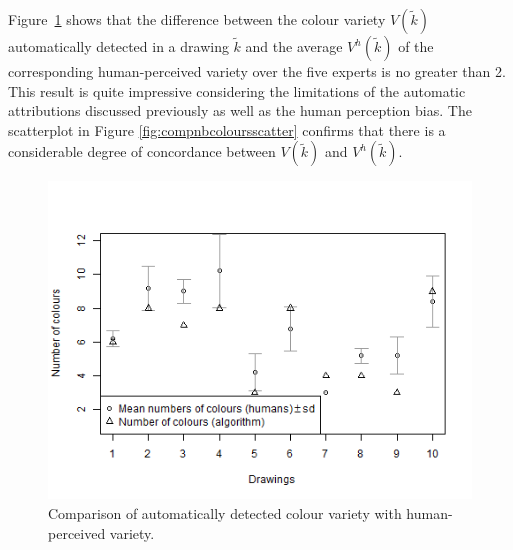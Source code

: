 \documentclass[11pt,a4paper]{article}
\begin{document}
Figure~\ref{fig:compnbcolourssd} shows that the difference between the colour variety $V(\tilde{k})$ automatically detected in a drawing $\tilde{k}$ and the average $V^h(\tilde{k})$ of the corresponding human-perceived variety over the five experts is no greater than 2. This result is quite impressive considering the limitations of the automatic attributions discussed previously as well as the human perception bias. The scatterplot in Figure \ref{fig:compnbcoloursscatter} confirms that there is a considerable degree of concordance between $V(\tilde{k})$ and $V^h(\tilde{k})$.

\begin{figure}[h!]
	\centering
	\includegraphics[width=\linewidth]{figures/comp_nb_colours_sd.png}
	\caption{Comparison of automatically detected colour variety with human-perceived variety.}
	\label{fig:compnbcolourssd}
\end{figure}
\end{document}
